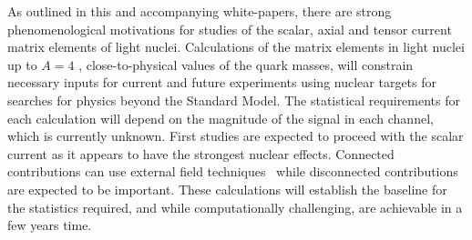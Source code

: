 As outlined in this and accompanying white-papers, there are strong phenomenological motivations for studies of the scalar, axial and tensor current matrix elements of light nuclei. Calculations of the matrix elements in light nuclei up to $A=4$ \cite{Winter:2017bfs}, close-to-physical values of the quark masses, will constrain necessary inputs for current and future experiments using nuclear targets for searches for physics beyond the Standard Model. The statistical requirements for each calculation will depend on the magnitude of the signal in each channel, which is currently unknown. First studies are expected to proceed with the scalar current as it appears to have the strongest nuclear effects. Connected contributions can use external field techniques~\cite{Savage:2016kon,Shanahan:2017bgi,Tiburzi:2017iux} while disconnected contributions are expected to be important. These calculations will establish the baseline for the statistics required, and while computationally challenging, are achievable in a few years time.



